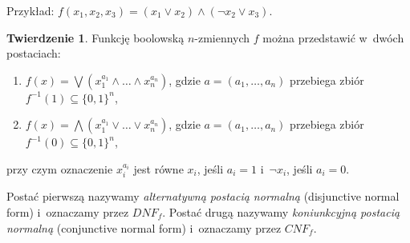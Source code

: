 \documentclass[a4paper,11pt,twoside]{article}
\theoremstyle{definition}
\newtheorem{tw}{Twierdzenie}
\begin{document}
\vspace{0.25cm}

Przykład: $f(x_1,x_2,x_3) = (x_1 \vee x_2) \wedge (\neg x_2 \vee x_3)$.
\begin{tw}
Funkcję boolowską $n$-zmiennych $f$ można przedstawić w~dwóch postaciach:
\begin{enumerate}
	\item $f(x) = \bigvee (x_1^{a_1} \wedge \dots \wedge x_n^{a_n})$, gdzie $a = (a_1, \dots,a_n)$ przebiega zbiór $f^{-1}(1) \subseteq \{0,1\}^n $,
	\item $f(x) = \bigwedge (x_1^{a_1} \vee \dots \vee x_n^{a_n})$, gdzie $a = (a_1, \dots,a_n)$ przebiega zbiór $f^{-1}(0) \subseteq \{0,1\}^n $,
\end{enumerate}
przy czym oznaczenie $x_i^{a_i}$ jest równe $x_i$, jeśli $a_i=1$ i~$\neg x_i$, jeśli $a_i=0$.

Postać pierwszą nazywamy {\em alternatywną postacią normalną} (disjunctive normal form) i~oznaczamy przez $\mathit{DNF}_f$. Postać drugą nazywamy {\em koniunkcyjną postacią normalną} (conjunctive normal form) i~oznaczamy przez $\mathit{CNF}_f$.
\end{tw}
\end{document}
